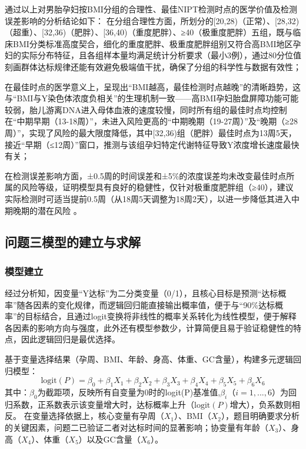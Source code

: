\documentclass[withoutpreface,bwprint]{cumcmthesis} %
\begin{document}
通过以上对男胎孕妇按BMI分组的合理性、最佳NIPT检测时点的医学价值及检测误差影响的分析结论如下：
在分组合理性方面，所划分的[20,28)（正常）、[28,32)（超重）、[32,36)（肥胖）、[36,40)（重度肥胖）、≥40（极重度肥胖）五组，既与临床BMI分类标准高度契合，细化的重度肥胖、极重度肥胖组别又符合高BMI地区孕妇的实际分布特征，且各组样本量均满足统计分析要求（最小3例），通过80分位值刻画群体达标规律还能有效避免极端值干扰，确保了分组的科学性与数据有效性；

在最佳时点的医学意义上，呈现出“BMI越高，最佳检测时点越晚”的清晰趋势，这与“BMI与Y染色体浓度负相关”的生理机制一致——高BMI孕妇胎盘屏障功能可能较弱，胎儿游离DNA进入母体血液的速度较慢，同时所有组的最佳时点均控制在“中期早期（13-18周）”，未进入风险更高的“中期晚期（19-27周）”及“晚期（≥28周）”，实现了风险的最大限度降低，其中[32,36)组（肥胖）最佳时点为13周5天，接近“早期（≤12周）”窗口，推测与该组孕妇特定代谢特征导致Y浓度增长速度最快有关；

在检测误差影响方面，±0.5周的时间误差和±5\%的浓度误差均未改变最佳时点所属的风险等级，证明模型具有良好的稳健性，仅针对极重度肥胖组（≥40），建议实际检测时可适当提前0.5周（从18周5天调整为18周2天），以进一步降低其进入中期晚期的潜在风险 。




\subsection{问题三模型的建立与求解}
\subsubsection{模型建立}
经过分析知，因变量“Y达标”为二分类变量（0/1），且核心目标是预测“达标概率”随各因素的变化规律，而逻辑回归能直接输出概率值，便于与“90\%达标概率”的目标结合，且通过logit变换将非线性的概率关系转化为线性模型，便于解释各因素的影响方向与强度，此外还有模型参数少，计算简便且易于验证稳健性的特点，因此逻辑回归是最优选择。

基于变量选择结果（孕周、BMI、年龄、身高、体重、GC含量），构建多元逻辑回归模型：  
\begin{equation}
    \text{logit}(P) = \beta_0 + \beta_1X_1 + \beta_2X_2 + \beta_3X_3 + \beta_4X_4 + \beta_5X_5 + \beta_6X_6
\end{equation}
其中：$\beta_0$为截距项，反映所有自变量为0时的logit(P)基准值,$\beta_i$（$i=1,...,6$）为回归系数，正系数表示该变量增大时，达标概率上升（$\text{logit}(P)$增大），负系数则相反。  
在变量选择依据上，核心变量有孕周（$X_1$）、BMI（$X_2$），题目明确要求分析的关键因素，问题二已验证二者对达标时间的显著影响；协变量有年龄（$X_3$）、身高（$X_4$）、体重（$X_5$）以及GC含量（$X_6$）。  
\end{document}
